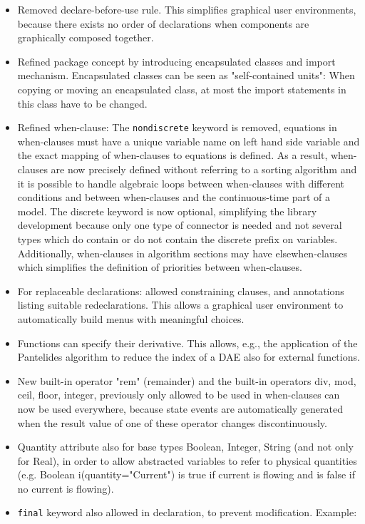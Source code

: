 \begin{itemize}
\item
  Removed declare-before-use rule. This simplifies graphical user
  environments, because there exists no order of declarations when
  components are graphically composed together.
\item
  Refined package concept by introducing encapsulated classes and import
  mechanism. Encapsulated classes can be seen as "self-contained units":
  When copying or moving an encapsulated class, at most the import
  statements in this class have to be changed.
\item
  Refined when-clause: The \lstinline!nondiscrete! keyword is removed, equations in
  when-clauses must have a unique variable name on left hand side
  variable and the exact mapping of when-clauses to equations is
  defined. As a result, when-clauses are now precisely defined without
  referring to a sorting algorithm and it is possible to handle
  algebraic loops between when-clauses with different conditions and
  between when-clauses and the continuous-time part of a model. The
  discrete keyword is now optional, simplifying the library development
  because only one type of connector is needed and not several types
  which do contain or do not contain the discrete prefix on variables.
  Additionally, when-clauses in algorithm sections may have
  elsewhen-clauses which simplifies the definition of priorities between
  when-clauses.
\item
  For replaceable declarations: allowed constraining clauses, and
  annotations listing suitable redeclarations. This allows a graphical
  user environment to automatically build menus with meaningful choices.
\item
  Functions can specify their derivative. This allows, e.g., the
  application of the Pantelides algorithm to reduce the index of a DAE
  also for external functions.
\item
  New built-in operator "rem" (remainder) and the built-in operators
  div, mod, ceil, floor, integer, previously only allowed to be used in
  when-clauses can now be used everywhere, because state events are
  automatically generated when the result value of one of these operator
  changes discontinuously.
\item
  Quantity attribute also for base types Boolean, Integer, String (and
  not only for Real), in order to allow abstracted variables to refer to
  physical quantities (e.g. Boolean i(quantity="Current") is true if
  current is flowing and is false if no current is flowing).
\item
  \lstinline!final! keyword also allowed in declaration, to prevent modification.
  Example:
\end{itemize}

